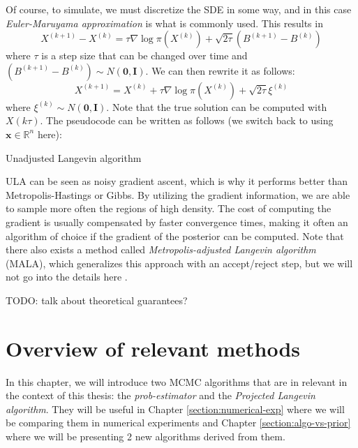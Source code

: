 \documentclass[12pt]{memoir}
\newcommand{\mb}{\mathbf}
\newcommand{\ti}{\textit}
\begin{document}
Of course, to simulate, we must discretize the SDE in some way, and in this case \textit{Euler-Maruyama approximation} is what is commonly used. This results in
\begin{equation}
    X^{(k+1)} - X^{(k)} = \tau \nabla \log\pi(X^{(k)}) + \sqrt{2\tau}(B^{(k+1)} - B^{(k)})
\end{equation}
where $\tau$ is a step size that can be changed over time and $(B^{(k+1)} - B^{(k)}) \sim N(\mb 0, \mb I)$. We can then rewrite it as follows:
\begin{equation}
    X^{(k+1)} = X^{(k)} + \tau \nabla \log\pi(X^{(k)}) + \sqrt{2\tau}\xi^{(k)}
\end{equation}
where $\xi^{(k)} \sim N(\mb 0, \mb I)$. Note that the true solution can be computed with $X(k\tau)$. The pseudocode can be written as follows (we switch back to using $\mb x \in \mathbb{R}^n$ here):\medbreak
\begin{algorithm}[H]
    \DontPrintSemicolon

    \Input{$\mb x^{(0)}, K, B, \tau_{1:K}$}
    \Output{$\mb x^{(B+1)}, \mb x^{(B+2)}, \dots, \mb x^{(K)}$}
    \For{$k\gets 1:K$}{ 
        $\boldsymbol{\xi}^{(k)} \sim N(\mb 0, \mb I)$\;
        $\mb x^{(k+1)} = \mb x^{(k)} + \tau^{(k)} \nabla \log\pi(\mb x^{(k)}) + \sqrt{2\tau^{(k)}}\boldsymbol{\xi}^{(k)}$\;
    }
    \caption{Unadjusted Langevin algorithm}
\end{algorithm}\medbreak

ULA can be seen as noisy gradient ascent, which is why it performs better than Metropolis-Hastings or Gibbs. By utilizing the gradient information, we are able to sample more often the regions of high density. The cost of computing the gradient is usually compensated by faster convergence times, making it often an algorithm of choice if the gradient of the posterior can be computed. Note that there also exists a method called \textit{Metropolis-adjusted Langevin algorithm} (MALA), which generalizes this approach with an accept/reject step, but we will not go into the details here \cite{mcmc:langenvin-blog:Ansari2024Apr, wiki:MALA}.

TODO: talk about theoretical guarantees?

\chapter{Overview of relevant methods} \label{section:relevant-methods}
In this chapter, we will introduce two MCMC algorithms that are in relevant in the context of this thesis: the \ti{prob-estimator} and the \ti{Projected Langevin algorithm}. They will be useful in Chapter \ref{section:numerical-exp} where we will be comparing them in numerical experiments and Chapter \ref{section:algo-vs-prior} where we will be presenting 2 new algorithms derived from them.\medbreak
\end{document}
